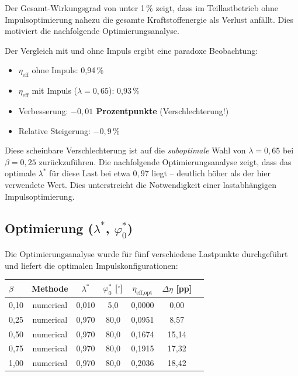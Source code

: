 ﻿\documentclass[a4paper,12pt]{article}
\begin{document}
Der Gesamt-Wirkungsgrad von unter 1\,\% zeigt, dass im Teillastbetrieb
ohne Impulsoptimierung nahezu die gesamte Kraftstoffenergie als Verlust
anfällt. Dies motiviert die nachfolgende Optimierungsanalyse.

Der Vergleich mit und ohne Impuls ergibt eine paradoxe Beobachtung:

\begin{itemize}
  \item $\eta_\text{eff}$ ohne Impuls: 0{,}94\,\%
  \item $\eta_\text{eff}$ mit Impuls ($\lambda=0{,}65$): 0{,}93\,\%
  \item Verbesserung: \textbf{$-0{,}01$ Prozentpunkte} (Verschlechterung!)
  \item Relative Steigerung: \textbf{$-0{,}9\,\%$}
\end{itemize}

Diese scheinbare Verschlechterung ist auf die \textit{suboptimale} Wahl von
$\lambda = 0{,}65$ bei $\beta = 0{,}25$ zurückzuführen. Die nachfolgende
Optimierungsanalyse zeigt, dass das optimale $\lambda^*$ für diese Last
bei etwa $0{,}97$ liegt -- deutlich höher als der hier verwendete Wert.
Dies unterstreicht die Notwendigkeit einer lastabhängigen Impulsoptimierung.

\subsection{Optimierung ($\lambda^*$, $\varphi_0^*$)}

Die Optimierungsanalyse wurde für fünf verschiedene Lastpunkte durchgeführt
und liefert die optimalen Impulskonfigurationen:

\begin{center}
\begin{tabular}{lcccccc}
\toprule
$\beta$ & Methode & $\lambda^*$ & $\varphi_0^*$ [$^\circ$] & $\eta_\text{eff,opt}$ & $\Delta\eta$ [pp] \\
\midrule
0{,}10 & numerical & 0{,}010 & 5{,}0 & 0{,}0000 & 0{,}00 \\
0{,}25 & numerical & 0{,}970 & 80{,}0 & 0{,}0951 & 8{,}57 \\
0{,}50 & numerical & 0{,}970 & 80{,}0 & 0{,}1674 & 15{,}14 \\
0{,}75 & numerical & 0{,}970 & 80{,}0 & 0{,}1915 & 17{,}32 \\
1{,}00 & numerical & 0{,}970 & 80{,}0 & 0{,}2036 & 18{,}42 \\
\bottomrule
\end{tabular}
\end{center}
\end{document}
